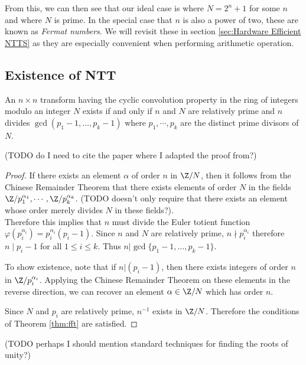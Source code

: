 From this, we can then see that our ideal case is where $N = 2^n + 1$ for some $n$ and where $N$ is prime. In the special case that $n$ is also a power of two, these are known as \emph{Fermat numbers}. We will revisit these in section \ref{sec:Hardware Efficient NTTS} as they are especially convenient when performing arithmetic operation.

\subsection{Existence of NTT}%
\label{sub:Existence of NTT}

\begin{theorem}\label{thm:fmt-transform-length}
    An $n \times n$ transform having the cyclic convolution property in the ring of integers modulo an integer $N$ exists if and only if $n$ and $N$ are relatively prime and $n$ divides $\gcd(p_1 - 1, \ldots, p_k - 1)$ where $p_1, \cdots, p_k$ are the distinct prime divisors of $N$.
\end{theorem}

(TODO do I need to cite the paper where I adapted the proof from?)
\begin{proof}
    If there exists an element $\alpha$ of order $n$ in $\Z/N$, then it follows from the Chinese Remainder Theorem that there exists elements of order $N$ in the fields $\Z/p_1^{\alpha_1}, \cdots, \Z/p_k^{\alpha_k}$. (TODO doesn't only require that there exists an element whose order merely divides $N$ in these fields?).\\
    Therefore this implies that $n$ must divide the Euler totient function $\varphi(p_i^{\alpha_i}) = p_i^{\alpha_i}(p_i - 1)$. Since $n$ and $N$ are relatively prime, $n \nmid p_i^{\alpha_i}$ therefore $n \mid p_i - 1$ for all $1 \le i \le k$. Thus $n | \gcd\{p_1 - 1, \ldots, p_k - 1\}$.

    \medskip

    To show existence, note that if $n | (p_i - 1)$, then there exists integers of order $n$ in $\Z/p_i^{\alpha_i}$. Applying the Chinese Remainder Theorem on these elements in the reverse direction, we can recover an element $\alpha \in \Z/N$ which has order $n$.

    \medskip

    Since $N$ and $p_i$ are relatively prime, $n^{-1}$ exists in $\Z/N$. Therefore the conditions of Theorem \ref{thm:fft} are satisfied.
\end{proof}

(TODO perhaps I should mention standard techniques for finding the roots of unity?)

